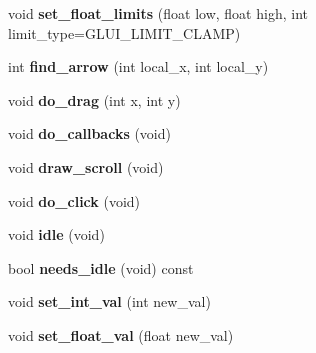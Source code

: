 \begin{DoxyCompactItemize}
\item 
\hypertarget{classGLUI__Scrollbar_a41dd618579772fb4b69d87ddd10a601d}{void {\bfseries set\-\_\-float\-\_\-limits} (float low, float high, int limit\-\_\-type=G\-L\-U\-I\-\_\-\-L\-I\-M\-I\-T\-\_\-\-C\-L\-A\-M\-P)}\label{classGLUI__Scrollbar_a41dd618579772fb4b69d87ddd10a601d}

\item 
\hypertarget{classGLUI__Scrollbar_ab81345b11efd1e3901443d68451d5a9f}{int {\bfseries find\-\_\-arrow} (int local\-\_\-x, int local\-\_\-y)}\label{classGLUI__Scrollbar_ab81345b11efd1e3901443d68451d5a9f}

\item 
\hypertarget{classGLUI__Scrollbar_abc9e5c7daaf6bac77eb8af728d46ddd8}{void {\bfseries do\-\_\-drag} (int x, int y)}\label{classGLUI__Scrollbar_abc9e5c7daaf6bac77eb8af728d46ddd8}

\item 
\hypertarget{classGLUI__Scrollbar_aec86dd3e95390d09b427670227d091e9}{void {\bfseries do\-\_\-callbacks} (void)}\label{classGLUI__Scrollbar_aec86dd3e95390d09b427670227d091e9}

\item 
\hypertarget{classGLUI__Scrollbar_ae9bede2305c61af3abb50ab05e91be72}{void {\bfseries draw\-\_\-scroll} (void)}\label{classGLUI__Scrollbar_ae9bede2305c61af3abb50ab05e91be72}

\item 
\hypertarget{classGLUI__Scrollbar_a83109afdb43d6d8a4cd3e38a4c9aed8a}{void {\bfseries do\-\_\-click} (void)}\label{classGLUI__Scrollbar_a83109afdb43d6d8a4cd3e38a4c9aed8a}

\item 
\hypertarget{classGLUI__Scrollbar_ab63e876c8f8e9a781632a09081f286ef}{void {\bfseries idle} (void)}\label{classGLUI__Scrollbar_ab63e876c8f8e9a781632a09081f286ef}

\item 
\hypertarget{classGLUI__Scrollbar_a025837fc483650dad77140a6a860d608}{bool {\bfseries needs\-\_\-idle} (void) const }\label{classGLUI__Scrollbar_a025837fc483650dad77140a6a860d608}

\item 
\hypertarget{classGLUI__Scrollbar_a2d263e3dde48426abf2ae9952800da24}{void {\bfseries set\-\_\-int\-\_\-val} (int new\-\_\-val)}\label{classGLUI__Scrollbar_a2d263e3dde48426abf2ae9952800da24}

\item 
\hypertarget{classGLUI__Scrollbar_a9218eae03ae93e87d27ac44fdeac212b}{void {\bfseries set\-\_\-float\-\_\-val} (float new\-\_\-val)}\label{classGLUI__Scrollbar_a9218eae03ae93e87d27ac44fdeac212b}


\end{DoxyCompactItemize}
